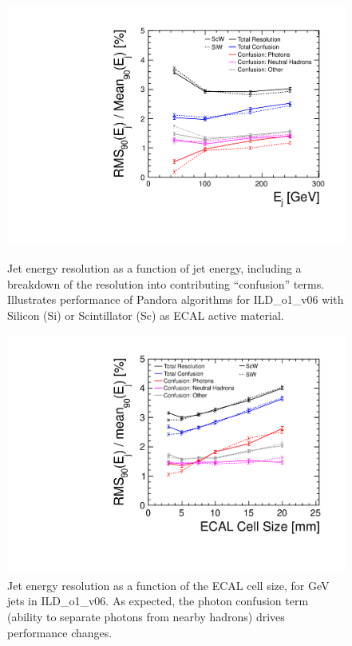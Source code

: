 \begin{figure}
	\begin{minipage}{.49\linewidth}
		\includegraphics[width=\linewith]{Software/PandoraPFA/JetEnergyResolution}
		\caption{Jet energy resolution as a function of jet energy, including a breakdown of the
		resolution into contributing “confusion” terms. Illustrates performance of
		Pandora algorithms for ILD\_o1\_v06 with Silicon (Si) or Scintillator (Sc) as ECAL
		active material.}
		\label{fig:Software:PandoraPFA:JetEnergyResolution}
	\end{minipage}\hfill
	\begin{minipage}{.49\linewidth}
		\includegraphics[width=\linewidth]{Software/PandoraPFA/ECAL_CellSize}
		\caption{Jet energy resolution as a function of the ECAL cell size, for \unit[250]{GeV} jets in
		ILD\_o1\_v06. As expected, the photon confusion term (ability to separate photons
		from nearby hadrons) drives performance changes.}
		\label{fig:Software:PandoraPFA:ECAL_CellSize}
	\end{minipage}
\end{figure}

